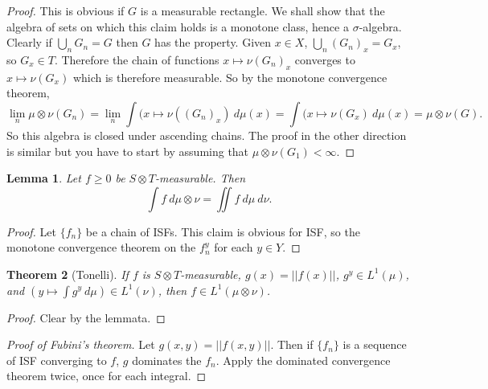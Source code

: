 \documentclass[12pt]{report}
\newtheorem{theorem}{Theorem}[chapter]
\newtheorem{lemma}[theorem]{Lemma}
\theoremstyle{definition}
\begin{document}
\begin{proof}
    This is obvious if $G$ is a measurable rectangle. We shall show that the algebra of sets on which this claim holds is a monotone class, hence a $\sigma$-algebra. Clearly if $\bigcup_n G_n = G$ then $G$ has the property. Given $x \in X$, $\bigcup_n (G_n)_x = G_x$, so $G_x \in T$. Therefore the chain of functions $x \mapsto \nu(G_n)_x$ converges to $x \mapsto \nu(G_x)$ which is therefore measurable. So by the monotone convergence theorem,
    $$\lim_n \mu \otimes \nu(G_n) = \lim_n \int (x \mapsto \nu((G_n)_x) ~d\mu(x) = \int (x \mapsto \nu(G_x) ~d\mu(x) = \mu \otimes \nu(G).$$
    So this algebra is closed under ascending chains. The proof in the other direction is similar but you have to start by assuming that $\mu \otimes \nu(G_1) < \infty$.
\end{proof}
\begin{lemma}
    Let $f \geq 0$ be $S \otimes T$-measurable. Then
    $$\int f ~d\mu \otimes \nu = \iint f ~d\mu ~d\nu.$$
\end{lemma}
\begin{proof}
    Let $\{f_n\}$ be a chain of ISFs. This claim is obvious for ISF, so the monotone convergence theorem on the $f_n^y$ for each $y \in Y$.
\end{proof}
\begin{theorem}[Tonelli]
    If $f$ is $S \otimes T$-measurable, $g(x) = ||f(x)||$, $g^y \in L^1(\mu)$, and $(y \mapsto \int g^y ~d\mu) \in L^1(\nu)$, then $f \in L^1(\mu \otimes \nu)$. 
\end{theorem}
\begin{proof}
    Clear by the lemmata.
\end{proof}
\begin{proof}[Proof of Fubini's theorem]
    Let $g(x, y) = ||f(x, y)||$. Then if $\{f_n\}$ is a sequence of ISF converging to $f$, $g$ dominates the $f_n$. Apply the dominated convergence theorem twice, once for each integral.
\end{proof}
\end{document}

